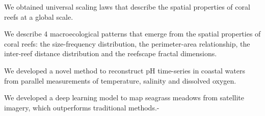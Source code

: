 \vspace{1cm}

\begin{contributionslist}
    \item We obtained universal scaling laws that describe the spatial
    properties of coral reefs at a global scale.
    \item We describe 4 macroecological patterns that emerge from the spatial
    properties of coral reefs: the size-frequency distribution, the
    perimeter-area relationship, the inter-reef distance distribution and
    the
    reefscape fractal dimensions.
    \item We developed a novel method to reconstruct pH time-series in coastal
    waters from parallel measurements of temperature, salinity and
    dissolved
    oxygen.
    \item We developed a deep learning model to map seagrass meadows from
    satellite imagery, which outperforms traditional methods.-
\end{contributionslist}